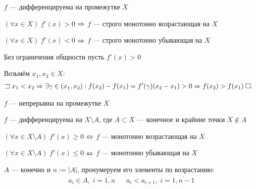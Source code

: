 \documentclass{article}
\begin{document}
\pagebreak

\theorem

$f$ --- дифференцируема на промежутке $X$

$(\forall x\in X)\;f'(x)>0$ $\Rightarrow$ $f$ --- строго монотонно возрастающая на $X$

$(\forall x\in X)\;f'(x)<0$ $\Rightarrow$ $f$ --- строго монотонно убывающая на $X$

\proof

Без ограничения общности пусть $f'(x)> 0$

Возьмём $x_1,x_2\in X$:
\begin{align*}
	\sqsupset x_1<x_2\Rightarrow \exists\gamma\in(x_1,x_2):f(x_2)-f(x_1)=f'(\gamma)(x_2-x_1)> 0\Rightarrow f(x_2)> f(x_1)\;\square.
\end{align*}

\theorem

$f$ --- непрерывна на промежутке $X$

$f$ --- дифференцируема на $X\setminus A$, где $A\subset X$ --- конечное и крайние точки $X\notin A$

$(\forall x\in X\setminus A)\;f'(x)\geq 0$ $\Leftrightarrow$ $f$ --- монотонно возрастающая на $X$

$(\forall x\in X\setminus A)\;f'(x)\leq 0$ $\Leftrightarrow$ $f$ --- монотонно убывающая на $X$


\proof

$A$ --- конечно и $n:=|A|$, пронумеруем его элементы по возрастанию:
\begin{align*}
	 & a_{i}\in A,\;i=\overline{1,n} &  & a_{i}<a_{i+1},\;i=\overline{1,n-1}
\end{align*}
\end{document}

